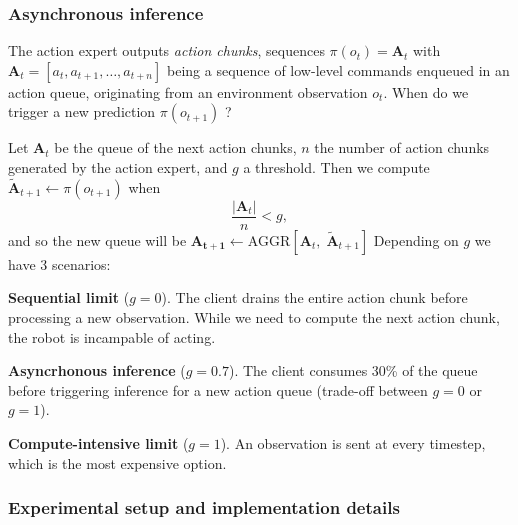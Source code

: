 \subsubsection{Asynchronous inference}
The action expert outputs \textit{action chunks}, sequences $\pi(o_t) = \mathbf{A}_t$ with $\mathbf{A}_t = [a_t,a_{t+1},\ldots,a_{t+n}]$ being a sequence of low-level commands enqueued in an action queue, originating from an environment observation $o_t$. When do we trigger a new prediction $\pi(o_{t+1})$ ?

Let $\mathbf{A}_t$ be the queue of the next action chunks, $n$ the number of action chunks generated by the action expert, and $g$ a threshold. Then we compute $\mathbf{\tilde{A}}_{t+1} \leftarrow \pi(o_{t+1})$ when
\[
\frac{|\mathbf{A}_t|}{n} < g,
\]
and so the new queue will be $\mathbf{A_{t+1}} \leftarrow \text{AGGR}[\mathbf{A}_{t},\; \mathbf{\tilde{A}}_{t+1}]$ Depending on $g$ we have 3 scenarios:
\begin{dashlist}
    \item \textbf{Sequential limit} ($g=0$). The client drains the entire action chunk before processing a new observation. While we need to compute the next action chunk, the robot is incampable of acting.
    \item \textbf{Asyncrhonous inference} ($g=0.7$). The client consumes 30\% of the queue before triggering inference for a new action queue (trade-off between $g=0$ or $g=1$).
    \item \textbf{Compute-intensive limit} ($g=1$). An observation is sent at every timestep, which is the most expensive option. 
\end{dashlist}

\subsubsection{Experimental setup and implementation details}

